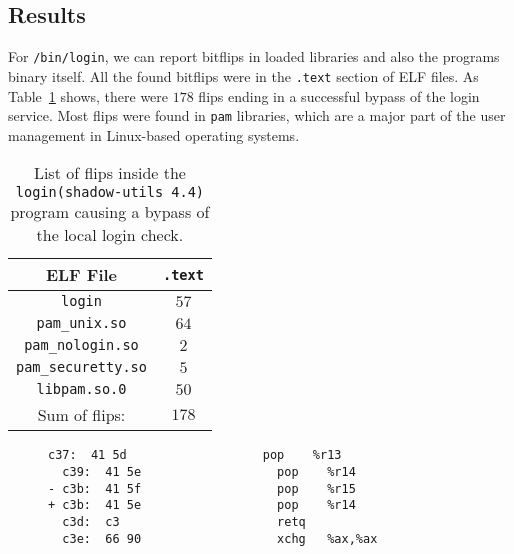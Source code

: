 \subsection{Results}

For \texttt{/bin/login}, we can report bitflips in loaded libraries and also the
program\textquotesingle s binary itself. All the found bitflips were in the
\texttt{.text} section of ELF files. As Table~\ref{tab:loginres} shows, there
were $178$ flips ending in a successful bypass of the login service. Most flips
were found in \texttt{pam} libraries, which are a major part of the user
management in Linux-based operating systems.

\begin{table}[!htb]
\centering
\begin{tabular}{c|c}
ELF File               & \texttt{.text} \\ \hline
\texttt{login}         & $57$ \\
\texttt{pam\_unix.so} & $64$ \\
\texttt{pam\_nologin.so} & $2$ \\
\texttt{pam\_securetty.so} & $5$ \\
\texttt{libpam.so.0} & $50$ \\ \hline
Sum of flips:                 & $178$
\end{tabular}
\caption{List of flips inside the \texttt{login(shadow-utils 4.4)} program
causing a bypass of the local login check.}
\label{tab:loginres}
\end{table}

\begin{figure}
\begin{minipage}{\linewidth}
\begin{lstlisting}[style=diff,
                   caption={Diff for a bitflip applied to the
\texttt{pam\_nologin.so} binary in order to bypass a credential check. The
pop to register $15$ gets exchanged with a pop to register $14$, therefore the
value of \texttt{r15} and \texttt{r14} are not as desired and hence the
execution path of \texttt{/bin/login} changes in a way the login
procedure succeeds.},
label=lst:loginex]
  c37:  41 5d                   pop    %r13
  c39:  41 5e                   pop    %r14
- c3b:  41 5f                   pop    %r15
+ c3b:  41 5e                   pop    %r14
  c3d:  c3                      retq
  c3e:  66 90                   xchg   %ax,%ax
\end{lstlisting}
\end{minipage}
\end{figure}

